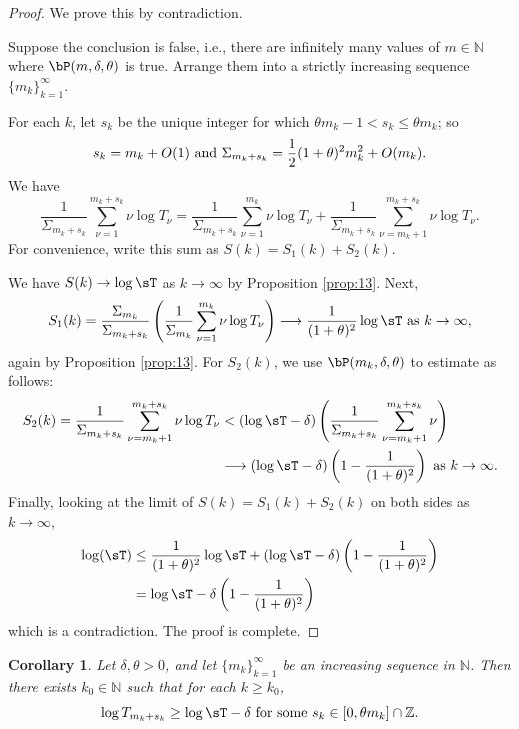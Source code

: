 \documentclass[12pt]{article}
\numberwithin{equation}{section}
\newtheorem{corollary}[theorem]{Corollary}
\newcommand{\Z}{\mathbb{Z}}
\newcommand{\N}{\mathbb{N}}
\begin{document}
\begin{proof}  We prove this by contradiction.

Suppose the conclusion is false, i.e., there are infinitely many values of $m\in \N$ where $\bP(m,\delta,\theta)$ is true.  Arrange them into a strictly increasing sequence $\{m_k\}_{k=1}^{\infty}$.  

For each $k$, let $s_k$ be the unique integer for which $\theta m_k-1<s_k\leq \theta m_k$; so 
$$s_k= m_k+O(1) \hbox{ and  } \Sigma_{m_k+s_k}=\frac{1}{2}(1+\theta)^2m_k^2+O(m_k).$$ 
 We have  
$$
\frac{1}{\Sigma_{m_k+s_k}}\sum_{\nu=1}^{m_k+s_k} \nu\log T_{\nu} = \frac{1}{\Sigma_{m_k+s_k}}\sum_{\nu=1}^{m_k} \nu\log T_{\nu}  + \frac{1}{\Sigma_{m_k+s_k}}\sum_{\nu=m_k+1}^{m_k+s_k} \nu\log T_{\nu}.
$$
For convenience, write this sum as $S(k)=S_1(k)+S_2(k)$.  

We have $S(k)\to\log\sT$ as $k\to\infty$ by Proposition \ref{prop:13}.  Next,  
$$
S_1(k) = \frac{\Sigma_{m_k}}{\Sigma_{m_k+s_k}}\left(\frac{1}{\Sigma_{m_k}}\sum_{\nu=1}^{m_k} \nu\log T_{\nu} \right) \longrightarrow \frac{1}{(1+\theta)^2}\log\sT \hbox{ as } k\to\infty,
$$
again by Proposition \ref{prop:13}.   For $S_2(k)$, we use $\bP(m_k,\delta,\theta)$ to estimate as follows:
$$\begin{aligned}
S_2(k) = \frac{1}{\Sigma_{m_k+s_k}}\sum_{\nu=m_k+1}^{m_k+s_k} \nu\log T_{\nu}
&< (\log\sT -\delta)\left(\frac{1}{\Sigma_{m_k+s_k}}\sum_{\nu=m_k+1}^{m_k+s_k} \nu \right) \\
&\longrightarrow (\log\sT -\delta)\left( 1-\frac{1}{(1+\theta)^2}\right) \hbox{ as }k\to\infty.
\end{aligned}$$
Finally, looking at the limit of $S(k)=S_1(k)+S_2(k)$ on both sides as $k\to\infty$, 
$$\begin{aligned}
\log(\sT) &\leq \frac{1}{(1+\theta)^2}\log\sT + (\log\sT -\delta)\left( 1-\frac{1}{(1+\theta)^2}\right) \\
& = \log\sT - \delta\left( 1-\frac{1}{(1+\theta)^2}\right) 
\end{aligned}$$
which is a contradiction.  The proof is complete. 
\end{proof}

\begin{corollary}\label{cor:15}
Let $\delta,\theta>0$, and let $\{m_k\}_{k=1}^{\infty}$ be an increasing sequence in $ \N$.  Then there exists $k_0\in \N$ such that  for each $k\geq k_0$, 
$$ \log T_{m_k+s_k}\geq \log \sT -\delta \hbox{ for some }s_k\in[0,\theta m_k]\cap \Z. $$
\end{corollary}
\end{document}
